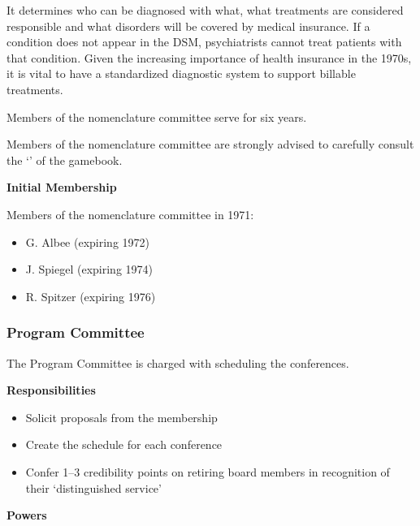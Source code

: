 \begin{refsection}
\begin{itemize}
\end{itemize}

It determines who can be diagnosed with what, what treatments are considered responsible and what disorders will be covered by medical insurance. If a condition does not appear in the DSM, psychiatrists cannot treat patients with that condition. Given the increasing importance of health insurance in the 1970s, it is vital to have a standardized diagnostic system to support billable treatments.

Members of the nomenclature committee serve for six years.

Members of the nomenclature committee are strongly advised to carefully consult the ‘’ of the gamebook.

\textbf{Initial Membership}

Members of the nomenclature committee in 1971:

\begin{itemize}
\item G. Albee (expiring 1972)

\item J. Spiegel (expiring 1974)

\item R. Spitzer (expiring 1976)

\end{itemize}

\newpage

\subsubsection{Program Committee}
\label{programcommittee}

The Program Committee is charged with scheduling the conferences. 

\textbf{Responsibilities}

\begin{itemize}
\item Solicit proposals from the membership

\item Create the schedule for each conference

\item Confer 1--3 credibility points on retiring board members in recognition of their ‘distinguished service’

\end{itemize}

\textbf{Powers}


\end{refsection}
